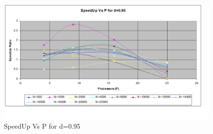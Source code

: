 \documentclass[twoside,11pt]{article}\usepackage{amsmath,amsfonts,amsthm,fullpage}
\begin{document}
\begin{figure}[!htbp]
\centering
\includegraphics[scale=.46]{charts/speedup_p_n_d_95} 
\caption{SpeedUp Vs P for d=0.95}
\label{SpeedUp Vs P for d=0.95}
\end{figure}



\pagebreak
\end{document}

